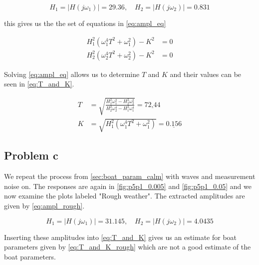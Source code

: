 \begin{equation}\label{eq:amplitudes}
    H_1 = |H(j \omega_1)| = 29.36,
    \quad
    H_2 = |H(j \omega_2)| = 0.831
\end{equation}

this gives us the the set of equations in \cref{eq:ampl_eq}

\begin{subequations}\label{eq:ampl_eq}
    \begin{align}
        H_1^2 (\omega_1^4 T^2 + \omega_1^2) - K^2 &= 0 \\
        H_2^2 (\omega_2^4 T^2 + \omega_2^2) - K^2 &= 0
    \end{align}
\end{subequations}

Solving \cref{eq:ampl_eq} allows us to determine $T$ and $K$ and their values can be seen in \cref{eq:T_and_K}.

\begin{subequations} \label{eq:T_and_K}
    \begin{align}
        T &= \sqrt{\frac{H_1^2 \omega_1^2 - H_2^2 \omega_2^2}{H_2^2 \omega_2^4 - H_1^2 \omega_1^4}} = \underline{72.44} \label{eq:T} \\
        K &= \sqrt{H_1^2 (\omega_1^4 T^2 + \omega_1^2)} = \underline{0.156} \label{eq:K}
    \end{align}
\end{subequations}





\subsection{Problem c}

We repeat the process from \cref{sec:boat_param_calm} with waves and measurement noise on. The responses are again in \cref{fig:p5p1_0.005} and \cref{fig:p5p1_0.05} and we now examine the plots labeled "Rough weather". The extracted amplitudes are given by \cref{eq:ampl_rough}.

\begin{equation}\label{eq:ampl_rough}
    H_1 = |H(j \omega_1)| = 31.145,
    \quad
    H_2 = |H(j \omega_2)| = 4.0435
\end{equation}

Inserting these amplitudes into \cref{eq:T_and_K} gives us an estimate for boat parameters given by \cref{eq:T_and_K_rough} which are not a good estimate of the boat parameters.

